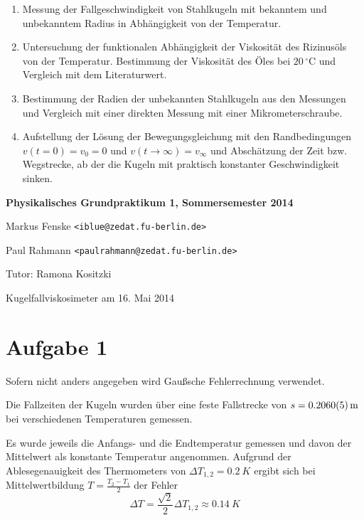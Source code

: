 \documentclass[a4paper,german,12pt,smallheadings]{scrartcl}
\begin{document}
\begin{enumerate}[1.]
  \item Messung der Fallgeschwindigkeit von Stahlkugeln mit bekanntem und
    unbekanntem Radius in Abhängigkeit von der Temperatur.
  \item Untersuchung der funktionalen Abhängigkeit der Viskosität des
    Rizinusöls von der Temperatur. Bestimmung der Viskosität des Öles bei $20
    \,^{\circ}\mathrm{C}$ und Vergleich mit dem Literaturwert.
  \item
    Bestimmung der Radien der unbekannten Stahlkugeln aus den Messungen und
    Vergleich mit einer direkten Messung mit einer Mikrometerschraube.
  \item Aufstellung der Lösung der Bewegungsgleichung mit den Randbedingungen
    $v(t=0) = v_0 = 0$ und $v(t \to \infty) = v_\infty$ und Abschätzung der
    Zeit bzw. Wegstrecke, ab der die Kugeln mit praktisch konstanter
    Geschwindigkeit sinken.
\end{enumerate}

\newpage
\begin{center}
\bfseries %
\sffamily %
\vspace{-40pt}
Physikalisches Grundpraktikum 1, Sommersemester 2014

Markus Fenske \texttt{<iblue@zedat.fu-berlin.de>}

Paul Rahmann \texttt{<paulrahmann@zedat.fu-berlin.de>}

Tutor: Ramona Kositzki

Kugelfallviskosimeter am 16. Mai 2014
\vspace{-10pt}
\end{center}

\section*{Aufgabe 1}
Sofern nicht anders angegeben wird Gaußsche Fehlerrechnung verwendet.


Die Fallzeiten der Kugeln wurden über eine feste Fallstrecke von $s =
\SI{0.2060+-0.0005}{m}$ bei verschiedenen Temperaturen gemessen.

Es wurde jeweils die Anfangs- und die Endtemperatur gemessen und davon der
Mittelwert als konstante Temperatur angenommen. Aufgrund der Ablesegenauigkeit
des Thermometers von $\Delta T_{1,2} = \SI{0.2}{K}$ ergibt sich bei Mittelwertbildung
$T = \frac{T_2 - T_1}{2}$ der Fehler
\begin{equation}
  \Delta T = \frac{\sqrt{2}}{2} \Delta T_{1,2} \approx \SI{0.14}{K}
\end{equation}
\end{document}
